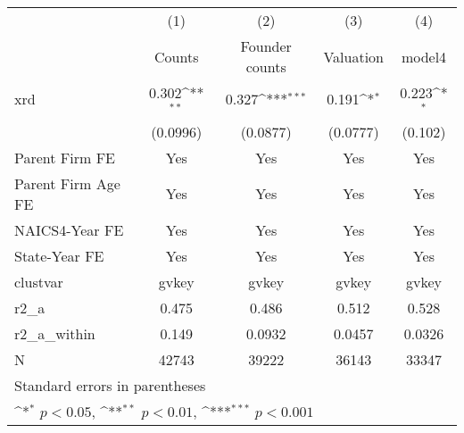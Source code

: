 {
\def\sym#1{\ifmmode^{#1}\else\(^{#1}\)\fi}
\begin{tabular}{l*{4}{c}}
\hline\hline
            &\multicolumn{1}{c}{(1)}&\multicolumn{1}{c}{(2)}&\multicolumn{1}{c}{(3)}&\multicolumn{1}{c}{(4)}\\
            &\multicolumn{1}{c}{Counts}&\multicolumn{1}{c}{Founder counts}&\multicolumn{1}{c}{Valuation}&\multicolumn{1}{c}{model4}\\
\hline
xrd         &       0.302\sym{**} &       0.327\sym{***}&       0.191\sym{*}  &       0.223\sym{*}  \\
            &    (0.0996)         &    (0.0877)         &    (0.0777)         &     (0.102)         \\
[1em]
Parent Firm FE&         Yes         &         Yes         &         Yes         &         Yes         \\
[1em]
Parent Firm Age FE&         Yes         &         Yes         &         Yes         &         Yes         \\
[1em]
NAICS4-Year FE&         Yes         &         Yes         &         Yes         &         Yes         \\
[1em]
State-Year FE&         Yes         &         Yes         &         Yes         &         Yes         \\
\hline
clustvar    &       gvkey         &       gvkey         &       gvkey         &       gvkey         \\
r2\_a        &       0.475         &       0.486         &       0.512         &       0.528         \\
r2\_a\_within &       0.149         &      0.0932         &      0.0457         &      0.0326         \\
N           &       42743         &       39222         &       36143         &       33347         \\
\hline\hline
\multicolumn{5}{l}{\footnotesize Standard errors in parentheses}\\
\multicolumn{5}{l}{\footnotesize \sym{*} \(p<0.05\), \sym{**} \(p<0.01\), \sym{***} \(p<0.001\)}\\
\end{tabular}
}
